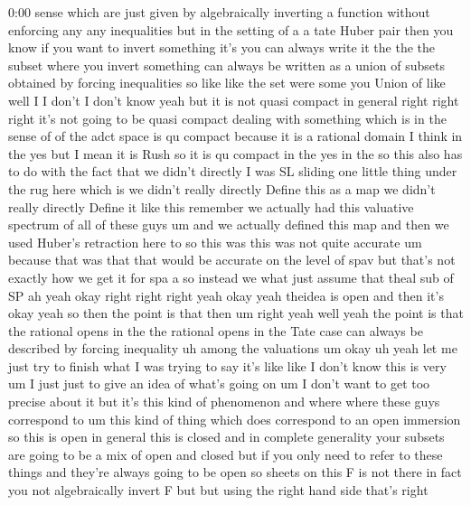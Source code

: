 \begin{unfinished}{0:00}
sense  which  are  just  given  by
algebraically  inverting  a  function
without  enforcing  any  any  inequalities
but  in  the  setting  of  a  a  tate  Huber
pair  then  you  know  if  you  want  to  invert
something  it's  you  can  always  write  it
the  the  the  subset  where  you  invert
something  can  always  be  written  as  a
union  of  subsets  obtained  by  forcing
inequalities  so  like  like  the  set
were  some  you  Union  of  like  well  I  I
don't  I  don't  know  yeah  but  it  is  not
quasi  compact  in  general  right  right
right  it's  not  going  to  be  quasi  compact
dealing  with  something  which  is  in  the
sense
of  of  the  adct  space  is  qu  compact
because  it  is  a  rational  domain  I  think
in  the  yes  but  I  mean  it  is  Rush  so  it
is  qu  compact  in  the  yes  in
the  so  this  also  has  to  do  with  the  fact
that  we  didn't  directly
I  was  SL  sliding  one  little  thing  under
the  rug  here  which  is  we  didn't  really
directly  Define  this  as  a  map  we  didn't
really  directly  Define  it  like  this
remember  we  actually  had  this  valuative
spectrum  of  all  of  these  guys  um  and  we
actually  defined  this  map  and  then  we
used  Huber's  retraction  here  to  so  this
was  this  was  not  quite  accurate  um
because  that  was  that  that  would  be
accurate  on  the  level  of  spav  but  that's
not  exactly  how  we  get  it  for  spa  a  so
instead  we
what  just  assume  that
theal  sub  of  SP  ah  yeah  okay  right  right
right  yeah  okay  yeah  theidea  is  open  and
then  it's  okay  yeah  so  then  the  point  is
that  then  um  right
yeah  well  yeah  the  point  is  that  the
rational  opens  in
the  the  rational  opens  in  the  Tate  case
can  always  be  described  by  forcing
inequality
uh  among  the
valuations  um  okay  uh  yeah  let  me  just
try  to  finish  what  I  was  trying  to  say
it's  like  like  I  don't  know  this  is  very
um  I  just  just  to  give  an  idea  of  what's
going  on  um  I  don't  want  to  get  too
precise  about  it  but  it's  this  kind  of
phenomenon  and  where  where  these  guys
correspond  to  um  this  kind  of  thing
which  does  correspond  to  an  open
immersion  so  this  is  open  in  general
this  is  closed  and  in  complete
generality  your  subsets  are  going  to  be
a  mix  of  open  and  closed  but  if  you  only
need  to  refer  to  these  things  and
they're  always  going  to  be
open
so  sheets  on  this  F  is  not  there  in  fact
you  not  algebraically  invert  F  but  but
using  the  right  hand  side  that's  right

\end{unfinished}
